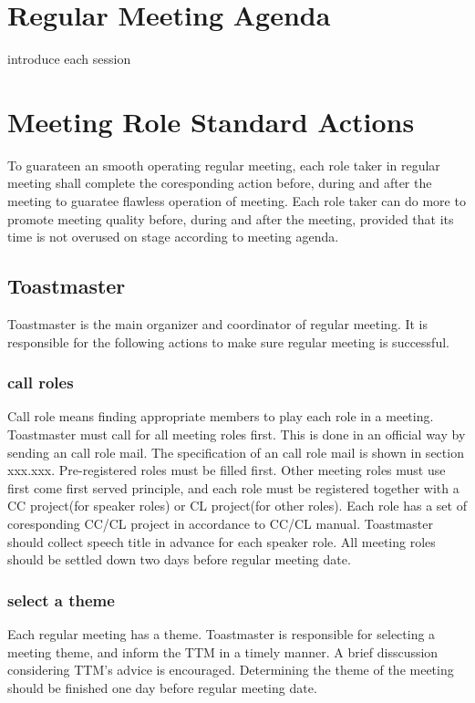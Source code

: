 \section{Regular Meeting Agenda}

introduce each session


\section{Meeting Role Standard Actions}

To guarateen an smooth operating regular meeting, each role taker 
in regular meeting shall complete the coresponding action before,
during and after the meeting to guaratee flawless operation of 
meeting. Each role taker can do more to promote meeting quality before, during 
and after the meeting, provided that its time is not overused on stage according 
to meeting agenda.

\subsection{Toastmaster}

Toastmaster is the main organizer and coordinator of regular meeting. 
It is responsible for the following actions to make sure regular meeting 
is successful.

\subsubsection{call roles}

Call role means finding appropriate members to play each role in a meeting. 
Toastmaster must call for all meeting roles first. This is done in an official
way by sending an call role mail. The specification of an call role mail is shown
in section xxx.xxx. Pre-registered roles must be filled first. Other meeting roles
must use first come first served principle, and each role must be registered together
with a CC project(for speaker roles) or CL project(for other roles). Each role has 
a set of coresponding CC/CL project in accordance to CC/CL manual. Toastmaster 
should collect speech title in advance for each speaker role. All meeting roles
should be settled down two days before regular meeting date. 

\subsubsection{select a theme}
Each regular meeting has a theme. Toastmaster is responsible for selecting a meeting
theme, and inform the TTM in a timely manner. A brief disscussion considering TTM's 
advice is encouraged. Determining the theme of the meeting should be finished one day 
before regular meeting date.

